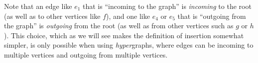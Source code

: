 \documentclass{article}
\theoremstyle{definition}
\newtheorem{defn}[thm]{Definition}
\theoremstyle{remark}
\begin{document}
Note that an edge like $e_1$ that is ``incoming to the graph'' is \emph{incoming} to the root (as well as to other vertices like $f$), and one like $e_4$ or $e_5$ that is ``outgoing from the graph'' is \emph{outgoing} from the root (as well as from other vertices such as $g$ or $h$).
This choice, which as we will see makes the definition of insertion somewhat simpler, is only possible when using \emph{hyper}graphs, where edges can be incoming to multiple vertices and outgoing from multiple vertices.

\end{document}
